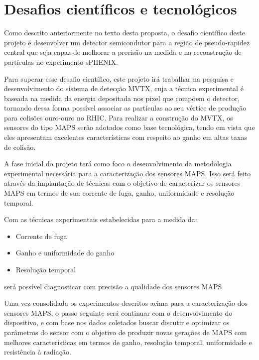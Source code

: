 \chapter{Desafios científicos e tecnológicos}

Como descrito anteriormente no texto desta proposta, o desafio científico deste projeto é desenvolver um detector semicondutor para a região de pseudo-rapidez central que seja capaz de melhorar a precisão na medida e na reconstrução de partículas no experimento sPHENIX. 

Para superar esse desafio científico, este projeto irá trabalhar na pesquisa e desenvolvimento do sistema de detecção MVTX, cuja a técnica experimental é baseada na medida da energia depositada nos pixel que compõem o detector, tornando dessa forma possível associar as partículas ao seu vértice de produção para colisões ouro-ouro no RHIC. Para realizar a construção do MVTX, os sensores do tipo MAPS serão adotados como base tecnológica, tendo em vista que eles apresentam excelentes características com respeito ao ganho em altas taxas de colisão. 

A fase inicial do projeto terá como foco o desenvolvimento da metodologia experimental necessária para a caracterização dos sensores MAPS. Isso será feito através da implantação de técnicas  com o objetivo de caracterizar os sensores MAPS em termos de sua corrente de fuga, ganho, uniformidade e resolução temporal.

Com as técnicas experimentais estabelecidas para a medida da:

\begin{itemize}
\item Corrente de fuga
\item Ganho e uniformidade do ganho
\item Resolução temporal 
\end{itemize}
será possível diagnosticar com precisão a qualidade dos sensores MAPS.

Uma vez consolidada os experimentos descritos acima para a caracterização dos sensores MAPS, o passo seguinte será continuar com o desenvolvimento do dispositivo, e com base nos dados coletados buscar discutir e optimizar os parâmetros do sensor com o objetivo de produzir novas gerações de MAPS com melhores características em termos de ganho, resolução temporal, uniformidade e resistência à radiação. 

